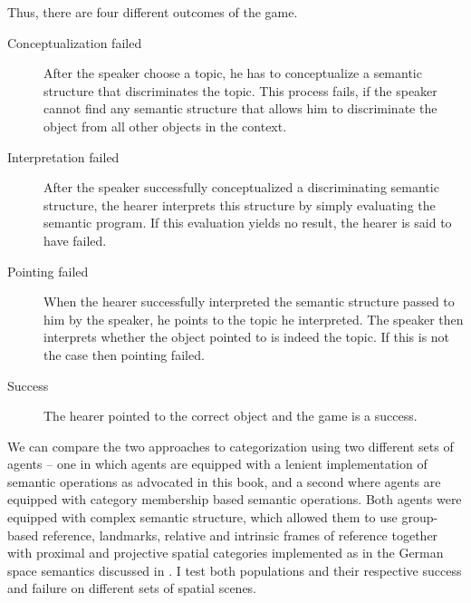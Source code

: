 Thus, there are four different outcomes of the game.
\begin{description}
\item[Conceptualization failed] After the speaker choose a topic, he has
to conceptualize a semantic structure that discriminates the topic.
This process fails, if the speaker cannot find any semantic structure
that allows him to discriminate the object from all other objects in the
context.
\item[Interpretation failed] After the speaker successfully conceptualized
a discriminating semantic structure, the hearer interprets this structure
by simply evaluating the semantic program. If this evaluation
yields no result, the hearer is said to have failed.
\item[Pointing failed] When the hearer successfully interpreted the
semantic structure passed to him by the speaker, he points
to the topic he interpreted. The speaker then interprets whether
the object pointed to is indeed the topic. If this is not the
case then pointing failed.
\item[Success] The hearer pointed to the correct object and
the game is a success. 
\end{description}

We can compare the two approaches to categorization 
using two different sets of agents --
one in which agents are equipped with a lenient implementation 
of semantic operations as advocated in this book, and a second where
agents are equipped with category membership based
semantic operations. Both agents were equipped with
complex semantic structure, which allowed them to use
group-based reference, landmarks, relative and intrinsic frames
of reference together with proximal and projective spatial categories
implemented as in the German space semantics discussed in 
. I test both populations and 
their respective success and failure on different sets of spatial scenes.

